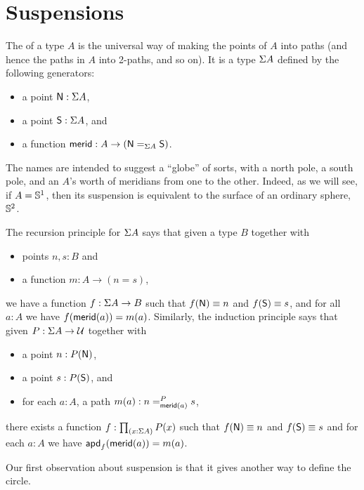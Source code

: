 \section{Suspensions}
\label{sec:suspension}

%
%
The  of a type $A$ is the universal way of making the points of $A$ into paths (and hence the paths in $A$ into 2-paths, and so on).
It is a type $\susp A$ defined by the following generators:
\begin{itemize}
\item a point $\north:\susp A$,
\item a point $\south:\susp A$, and
\item a function $\merid:A \to (\id[\susp A]\north\south)$.
\end{itemize}
The names are intended to suggest a ``globe'' of sorts, with a north pole, a south pole, and an $A$'s worth of meridians
%
%
from one to the other.
Indeed, as we will see, if $A=\Sn^1$, then its suspension is equivalent to the surface of an ordinary sphere, $\Sn^2$.

%
The recursion principle for $\susp A$ says that given a type $B$ together with
\begin{itemize}
\item points $n,s:B$ and
\item a function $m:A \to (n=s)$,
\end{itemize}
we have a function $f:\susp A \to B$ such that $f(\north)\jdeq n$ and $f(\south)\jdeq s$, and for all $a:A$ we have $\ap f {\merid(a)} = m(a)$.
%
Similarly, the induction principle says that given $P:\susp A \to \type$ together with
\begin{itemize}
\item a point $n:P(\north)$,
\item a point $s:P(\south)$, and
\item for each $a:A$, a path $m(a):\dpath P{\merid(a)}ns$,
\end{itemize}
there exists a function $f:\prd{x:\susp A} P(x)$ such that $f(\north)\jdeq n$ and $f(\south)\jdeq s$ and for each $a:A$ we have $\apd f {\merid(a)} = m(a)$.

Our first observation about suspension is that it gives another way to define the circle.

